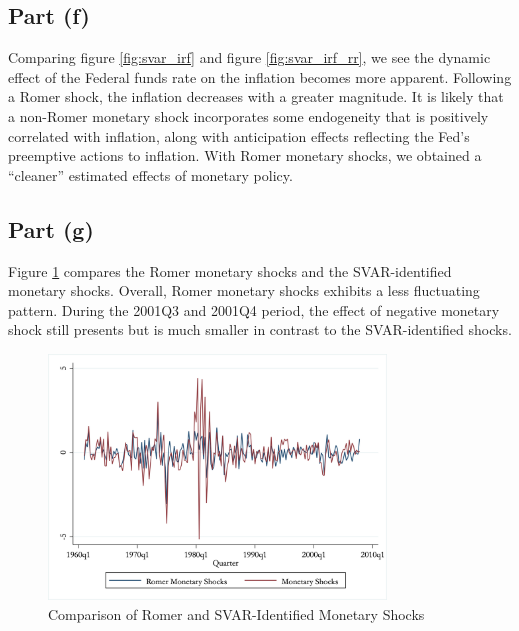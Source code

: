 \documentclass[12pt]{article}
\begin{document}
\subsection*{Part (f)} 

Comparing figure \ref{fig:svar_irf} and figure \ref{fig:svar_irf_rr}, 
we see the dynamic effect of the Federal funds rate on the inflation becomes more apparent. Following a Romer shock, the inflation decreases with a greater magnitude. 
It is likely that a non-Romer monetary shock incorporates some endogeneity that is positively correlated with inflation, 
along with anticipation effects reflecting the Fed's preemptive actions to inflation. 
With Romer monetary shocks, we obtained a ``cleaner'' estimated effects of monetary policy. 

\subsection*{Part (g)} 

Figure \ref{fig:compare_shocks} compares the Romer monetary shocks and the SVAR-identified monetary shocks. 
Overall, Romer monetary shocks exhibits a less fluctuating pattern. 
During the 2001Q3 and 2001Q4 period, the effect of negative monetary shock still presents but is much smaller in contrast to the SVAR-identified shocks.

\begin{figure}[ht]
    \centering
    \includegraphics[width=0.8\textwidth]{figs/compare_monetary_shocks}
    \caption{Comparison of Romer and SVAR-Identified Monetary Shocks}
    \label{fig:compare_shocks}
\end{figure}
\end{document}
